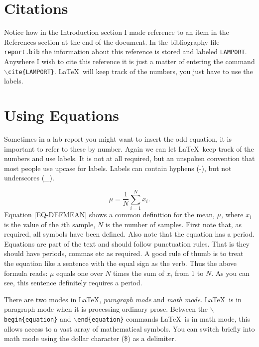 \documentclass{article}	%
\begin{document}
\section{Citations}
Notice how in the Introduction section I made reference to an item in
the References section at the end of the document.  In the
bibliography file \texttt{report.bib} the information about this
reference is stored and labeled \texttt{LAMPORT}.  Anywhere I wish to
cite this reference it is just a matter of entering the command
\texttt{$\backslash$cite\{LAMPORT\}}.  \LaTeX\ will keep track of the
numbers, you just have to use the labels.

\section{Using Equations}
Sometimes in a lab report you might want to insert the odd equation,
it is important to refer to these by number.  Again we can let
\LaTeX\ keep track of the numbers and use labels.  It is not at all
required, but an unspoken convention that most people use upcase for
labels.  Labels can contain hyphens (-), but not underscores (\_).

\begin{equation}
\mu = \frac{1}{N}\sum_{i=1}^N x_i.
\label{EQ-DEFMEAN}
\end{equation}
Equation \ref{EQ-DEFMEAN} shows a common definition for the mean,
$\mu$, where $x_i$ is the value of the $i$th sample, $N$ is the number of samples.
First note that, as required, all symbols have been defined.
Also note that the equation has a period. Equations are part of the text and
should follow punctuation rules. That is they should have periods, commas
etc as required. A good rule of thumb is to treat the equation like
a sentence with the equal sign as the verb. Thus the above formula
reads:
$\mu$ equals one over $N$ times the sum of $x_i$ from 1 to $N$. As you can
see, this sentence
definitely requires a period.

There are two modes in \LaTeX, \textit{paragraph mode} and \textit{math
mode}.  \LaTeX\ is in paragraph mode when it is processing ordinary
prose\cite{DILLER}.  Between the
\texttt{$\backslash$begin\{equation\}} and
\texttt{$\backslash$end\{equation\}} commands \LaTeX\ is in math mode,
this allows access to a vast array of mathematical symbols.  You can
switch briefly into math mode using the dollar character (\$) as a
delimiter.
\end{document}
